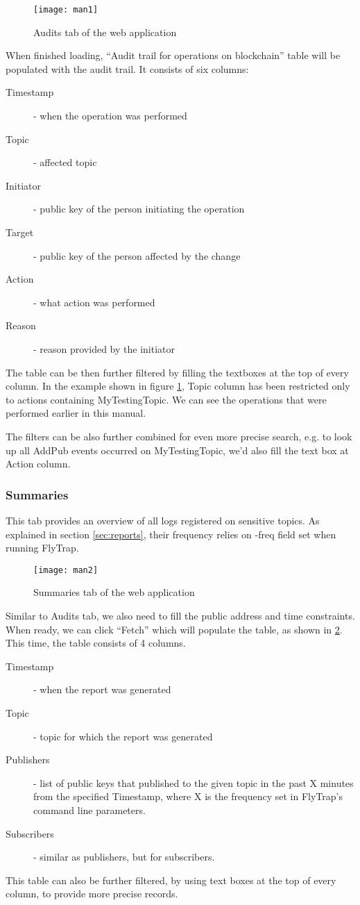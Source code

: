 \begin{figure}[h]
    \centering
    \texttt{[image: man1]}
    \caption{Audits tab of the web application}
    \label{fig:man1}
\end{figure}
When finished loading, ``Audit trail for operations on blockchain'' table will be populated with the audit trail. It consists of six columns:
\begin{description}
 \item[Timestamp] - when the operation was performed
 \item[Topic] - affected topic
 \item[Initiator] - public key of the person initiating the operation
 \item[Target] - public key of the person affected by the change
 \item[Action] - what action was performed 
 \item[Reason] - reason provided by the initiator
\end{description}
The table can be then further filtered by filling the textboxes at the top of every column. In the example shown in figure \ref{fig:man1}, Topic column has been restricted only to actions containing MyTestingTopic. We can see the operations that were performed earlier in this manual.

The filters can be also further combined for even more precise search, e.g. to look up all AddPub events occurred on MyTestingTopic, we'd also fill the text box at Action column.
\subsubsection{Summaries}
This tab provides an overview of all logs registered on sensitive topics. As explained in section \ref{sec:reports}, their frequency relies on -freq field set when running FlyTrap.
\begin{figure}[h]
    \centering
    \texttt{[image: man2]}
    \caption{Summaries tab of the web application}
    \label{fig:man2}
\end{figure}

Similar to Audits tab, we also need to fill the public address and time constraints. When ready, we can click ``Fetch'' which will populate the table, as shown in \ref{fig:man2}. This time, the table consists of 4 columns.
\begin{description}
  \item[Timestamp] - when the report was generated
  \item[Topic] - topic for which the report was generated
  \item[Publishers] - list of public keys that published to the given topic in the past X minutes from the specified Timestamp, where X is the frequency set in FlyTrap's command line parameters.
  \item[Subscribers] - similar as publishers, but for subscribers.
\end{description}
This table can also be further filtered, by using text boxes at the top of every column, to provide more precise records.
